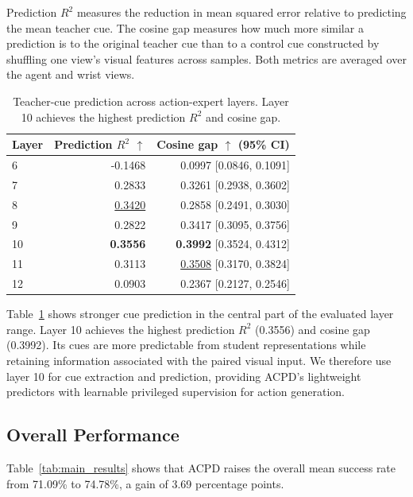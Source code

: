 \documentclass{ELSP}
\begin{document}
Prediction $R^2$ measures the reduction in mean squared
error relative to predicting the mean teacher cue.
The cosine gap measures how much more similar a prediction
is to the original teacher cue than to a control cue
constructed by shuffling one view's visual features across
samples. Both metrics are averaged over the agent and
wrist views.

\begin{table}[!htbp]
\centering
\caption{Teacher-cue prediction across action-expert layers.
Layer 10 achieves the highest prediction $R^2$ and cosine gap.}
\label{tab:layer_selection}
\begin{tabular*}{0.95\columnwidth}{@{\extracolsep{\fill}}lrr@{}}
\toprule
Layer & Prediction $R^2$ $\uparrow$
      & Cosine gap $\uparrow$ (95\% CI) \\
\midrule
6  & -0.1468 & 0.0997 [0.0846, 0.1091] \\
7  &  0.2833 & 0.3261 [0.2938, 0.3602] \\
8  & \underline{0.3420} & 0.2858 [0.2491, 0.3030] \\
9  &  0.2822 & 0.3417 [0.3095, 0.3756] \\
10 & \textbf{0.3556}
   & \textbf{0.3992} [0.3524, 0.4312] \\
11 &  0.3113 & \underline{0.3508} [0.3170, 0.3824] \\
12 &  0.0903 & 0.2367 [0.2127, 0.2546] \\
\bottomrule
\end{tabular*}
\end{table}

Table~\ref{tab:layer_selection} shows stronger cue prediction
in the central part of the evaluated layer range.
Layer 10 achieves the highest prediction $R^2$ (0.3556)
and cosine gap (0.3992).
Its cues are more predictable from student representations
while retaining information associated with the paired
visual input.
We therefore use layer 10 for cue extraction and prediction,
providing ACPD's lightweight predictors with learnable
privileged supervision for action generation.

\FloatBarrier
\subsection{Overall Performance}

Table~\ref{tab:main_results} shows that ACPD raises the overall
mean success rate from 71.09\% to 74.78\%, a gain of
3.69 percentage points.
\end{document}
